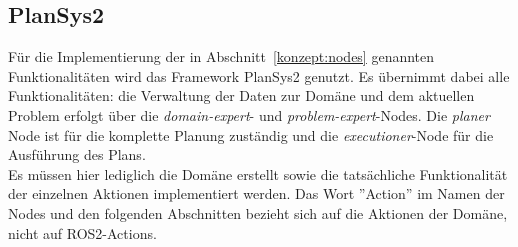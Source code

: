 \subsection{PlanSys2}
Für die Implementierung der in Abschnitt~\ref{konzept:nodes} genannten Funktionalitäten wird das Framework \ac{PlanSys2} genutzt.
Es übernimmt dabei alle Funktionalitäten: die Verwaltung der Daten zur Domäne und dem aktuellen Problem erfolgt über die \emph{domain-expert}- und \emph{problem-expert}-Nodes.
Die \emph{planer} Node ist für die komplette Planung zuständig und die \emph{executioner}-Node für die Ausführung des Plans.\\
Es müssen hier lediglich die Domäne erstellt sowie die tatsächliche Funktionalität der einzelnen Aktionen implementiert werden.
Das Wort ''Action'' im Namen der Nodes und den folgenden Abschnitten bezieht sich auf die Aktionen der Domäne, nicht auf \ac{ROS2}-Actions.


